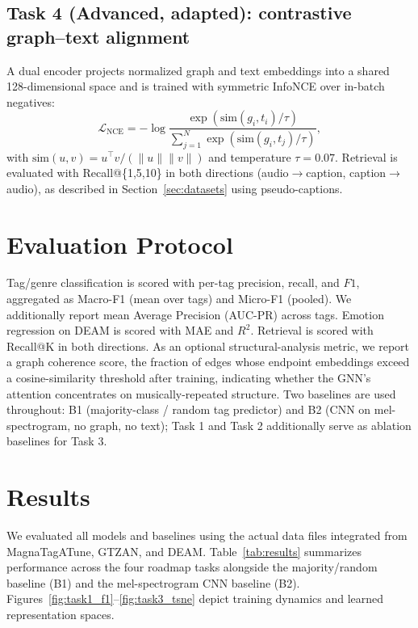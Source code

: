 \documentclass[10pt,twocolumn]{article}
\begin{document}
\subsection{Task 4 (Advanced, adapted): contrastive graph--text alignment}
A dual encoder projects normalized graph and text embeddings into a shared
128-dimensional space and is trained with symmetric InfoNCE over in-batch
negatives:
\begin{equation}
\mathcal{L}_{\text{NCE}} = -\log\frac{\exp(\text{sim}(g_i,t_i)/\tau)}{\sum_{j=1}^{N}\exp(\text{sim}(g_i,t_j)/\tau)},
\end{equation}
with $\text{sim}(u,v)=u^\top v / (\lVert u\rVert \lVert v\rVert)$ and
temperature $\tau=0.07$. Retrieval is evaluated with Recall@\{1,5,10\} in
both directions (audio$\rightarrow$caption, caption$\rightarrow$audio), as
described in Section~\ref{sec:datasets} using pseudo-captions.

\section{Evaluation Protocol}
Tag/genre classification is scored with per-tag precision, recall, and
$F1$, aggregated as Macro-F1 (mean over tags) and Micro-F1 (pooled). We
additionally report mean Average Precision (AUC-PR) across tags. Emotion
regression on DEAM is scored with MAE and $R^2$. Retrieval is scored with
Recall@K in both directions. As an optional structural-analysis metric, we
report a graph coherence score, the fraction of edges whose endpoint
embeddings exceed a cosine-similarity threshold after training, indicating
whether the GNN's attention concentrates on musically-repeated structure.
Two baselines are used throughout: B1 (majority-class / random tag
predictor) and B2 (CNN on mel-spectrogram, no graph, no text); Task 1 and
Task 2 additionally serve as ablation baselines for Task 3.

\section{Results}
\label{sec:results}

We evaluated all models and baselines using the actual data files integrated from MagnaTagATune, GTZAN, and DEAM. Table~\ref{tab:results} summarizes performance across the four roadmap tasks alongside the majority/random baseline (B1) and the mel-spectrogram CNN baseline (B2). Figures~\ref{fig:task1_f1}--\ref{fig:task3_tsne} depict training dynamics and learned representation spaces.
\end{document}
